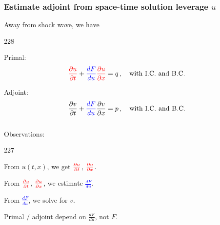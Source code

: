 \documentclass{beamer}
\newcommand{\barrow}{\item[\color{darkred}\ding{228}]}
\newcommand{\carrow}{\item[\color{darkred}\ding{227}]}
\begin{document}
\begin{frame}
    \frametitle{Estimate adjoint from space-time solution \hfill \scriptsize{leverage $u$}} \small
    Away from shock wave, we have
    \begin{dinglist}{228}
        \barrow Primal:
        $$
            \textcolor{red}{\frac{\partial u}{\partial t}} + \textcolor{blue}{\frac{d F}{d u}} \textcolor{red}{\frac{\partial u}{\partial x}} = q \,,
            \quad \textrm{with I.C. and B.C.}
        $$
        \barrow
        Adjoint:
        $$
            \frac{\partial v}{\partial t} + \textcolor{blue}{\frac{dF}{du}} \frac{\partial v}{\partial x} = p\,,
            \quad \textrm{with I.C. and B.C.}
        $$\\
        \vspace{.3cm}
        Observations:\\
        \vspace{.2cm}
        \begin{dinglist}{227}
            \carrow From $u(t,x)$, we get
            $\textcolor{red}{\frac{\partial u}{\partial t}}$, 
            $\textcolor{red}{\frac{\partial u}{\partial x}}$.
  
            \vspace{.3cm}
            \carrow From 
            $\textcolor{red}{\frac{\partial u}{\partial t}}$, 
            $\textcolor{red}{\frac{\partial u}{\partial x}}$, we
            estimate \textcolor{blue}{$\frac{dF}{du}$}. 

            \vspace{.3cm}
            \carrow From \textcolor{blue}{$\frac{dF}{du}$}, we solve for $v$.

            \vspace{.3cm}
            \carrow Primal / adjoint depend on {$\frac{dF}{du}$}, not $F$.
        \end{dinglist}
    \end{dinglist}
    
\end{frame}
\end{document}
